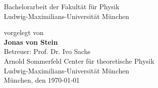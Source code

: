 \documentclass[a4paper,11pt,twoside,openright]{report}
\newcommand{\authorname}{Jonas von Stein}
\newcommand{\thesisdate}{\today}
\begin{document}
\begin{titlepage}
\begin{center}
    \vspace*{0.5cm}
    \Large
    Bachelorarbeit der Fakultät für Physik\\
    Ludwig-Maximilians-Universität München

    \vspace*{1.5cm}
    \large
    vorgelegt von\\[0.1cm]
    \Large \textbf{\authorname}\\

    \vfill
    \large
    Betreuer: Prof. Dr. Ivo Sachs\\[0.1cm]
    Arnold Sommerfeld Center für theoretische Physik \\[0.1cm]
    Ludwig-Maximilians-Universität München\\
    \vspace*{1.5cm}
    München, den \thesisdate
  \end{center}
\end{titlepage}


\cleardoublepage
{}
\tableofcontents
\clearpage


\pagestyle{fancy}
\fancyhf{} %


\lhead[\fancyplain{}{\thepage}]{\fancyplain{}{\rightmark}}

\rhead[\fancyplain{}{\leftmark}]{\fancyplain{}{\thepage}}

\cfoot{}





\clearpage{\pagestyle{empty}\cleardoublepage}


\clearpage{\pagestyle{empty}\cleardoublepage}


\clearpage{\pagestyle{empty}\cleardoublepage}


\clearpage{\pagestyle{empty}\cleardoublepage}


\clearpage{\pagestyle{empty}\cleardoublepage}


\clearpage{\pagestyle{empty}\cleardoublepage}


\clearpage{\pagestyle{empty}\cleardoublepage}


\clearpage{\pagestyle{empty}\cleardoublepage}
\end{document}
